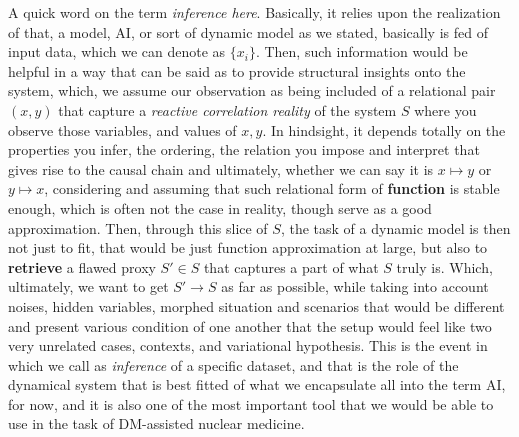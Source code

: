 \documentclass[9pt,a4paper]{article}
\begin{document}
A quick word on the term \textit{inference here}. Basically, it relies upon the realization of that, a model, AI, or sort of dynamic model as we stated, basically is fed of input data, which we can denote as $\{x_{i}\}$. Then, such information would be helpful in a way that can be said as to provide structural insights onto the system, which, we assume our observation as being included of a relational pair $(x,y)$ that capture a \textit{reactive correlation reality} of the system $S$ where you observe those variables, and values of $x,y$. In hindsight, it depends totally on the properties you infer, the ordering, the relation you impose and interpret that gives rise to the causal chain and ultimately, whether we can say it is $x\mapsto y$ or $y\mapsto x$, considering and assuming that such relational form of \textbf{function} is stable enough, which is often not the case in reality, though serve as a good approximation. Then, through this slice of $S$, the task of a dynamic model is then not just to fit, that would be just function approximation at large, but also to \textbf{retrieve} a flawed proxy $S'\in S$ that captures a part of what $S$ truly is. Which, ultimately, we want to get $S'\to S$ as far as possible, while taking into account noises, hidden variables, morphed situation and scenarios that would be different and present various condition of one another that the setup would feel like two very unrelated cases, contexts, and variational hypothesis. This is the event in which we call as \textit{inference} of a specific dataset, and that is the role of the dynamical system that is best fitted of what we encapsulate all into the term AI, for now, and it is also one of the most important tool that we would be able to use in the task of DM-assisted nuclear medicine. 
\end{document}
